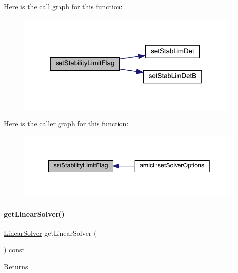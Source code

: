 Here is the call graph for this function\+:
\nopagebreak
\begin{figure}[H]
\begin{center}
\leavevmode
\includegraphics[width=309pt]{classamici_1_1_solver_a618a94f1d84f9c71230d476f9a0205ce_cgraph}
\end{center}
\end{figure}
Here is the caller graph for this function\+:
\nopagebreak
\begin{figure}[H]
\begin{center}
\leavevmode
\includegraphics[width=342pt]{classamici_1_1_solver_a618a94f1d84f9c71230d476f9a0205ce_icgraph}
\end{center}
\end{figure}
\mbox{\label{classamici_1_1_solver_aa5cde2d316aae1d60d6eaf94ce7a854f}} 
\paragraph{\texorpdfstring{get\+Linear\+Solver()}{getLinearSolver()}}
{\footnotesize\ttfamily \mbox{\hyperlink{namespaceamici_a1a6a4776314a0843143e5631c3ce21a7}{Linear\+Solver}} get\+Linear\+Solver (\begin{DoxyParamCaption}{ }\end{DoxyParamCaption}) const}

\begin{DoxyReturn}{Returns}

\end{DoxyReturn}


